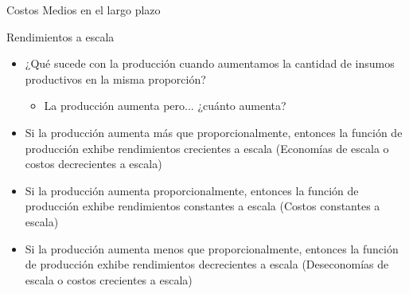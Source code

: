 \documentclass{beamer}
\begin{document}
\begin{frame}{Costos Medios en el largo plazo}
    \centering
\end{frame}

\begin{frame}{Rendimientos a escala}
\begin{itemize}
    \item ¿Qué sucede con la producción cuando aumentamos la cantidad de insumos productivos en la misma proporción?
    \begin{itemize}
        \item La producción aumenta pero... ¿cuánto aumenta?
    \end{itemize}
    \item Si la producción aumenta más que proporcionalmente, entonces la función de producción exhibe rendimientos crecientes a escala (Economías de escala o costos decrecientes a escala)
    \item Si la producción aumenta proporcionalmente, entonces la función de producción exhibe rendimientos constantes a escala (Costos constantes a escala)
    \item Si la producción aumenta menos que proporcionalmente, entonces la función de producción exhibe rendimientos decrecientes a escala (Deseconomías de escala o costos crecientes a escala)
\end{itemize}
\end{frame}
\end{document}
